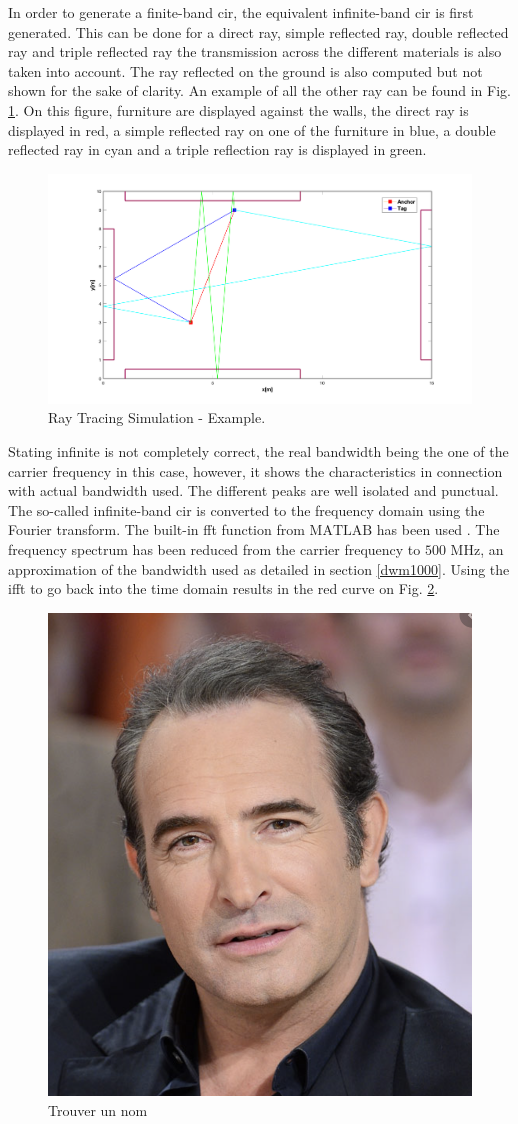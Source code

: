 In order to generate a finite-band \gls{cir}, the equivalent infinite-band \gls{cir} is first generated. This can be done for a direct ray, simple reflected ray, double reflected ray and triple reflected ray the transmission across the different materials is also taken into account. The ray reflected on the ground is also computed but not shown for the sake of clarity. An example of all the other ray can be found in Fig. \ref{fig:ray_simu}. On this figure, furniture are displayed against the walls, the direct ray is displayed in red, a simple reflected ray on one of the furniture in blue, a double reflected ray in cyan and a triple reflection ray is displayed in green.

\begin{figure}[H]
\centering
\includegraphics[width=.75\linewidth]{Images/rays_example.png}
\caption{Ray Tracing Simulation - Example. \label{fig:ray_simu}}
\end{figure}

Stating infinite is not completely correct, the real bandwidth being the one of the carrier frequency in this case, however, it shows the characteristics in connection with actual bandwidth used. The different peaks are well isolated and punctual. The so-called infinite-band \gls{cir} is converted to the frequency domain using the Fourier transform. The built-in \gls{fft} function from $\text{MATLAB}$ has been used \cite{mathworks}. The frequency spectrum has been reduced from the carrier frequency to $\text{500 MHz}$, an approximation of the bandwidth used as detailed in section \ref{dwm1000}. Using the \gls{ifft} to go back into the time domain results in the red curve on Fig. \ref{fig:conv_fin}.

\begin{figure}[H]
\centering
\includegraphics[width=.2\linewidth]{Images/Temporary_pic.png}
\caption{Trouver un nom \label{fig:conv_fin}}
\end{figure}

